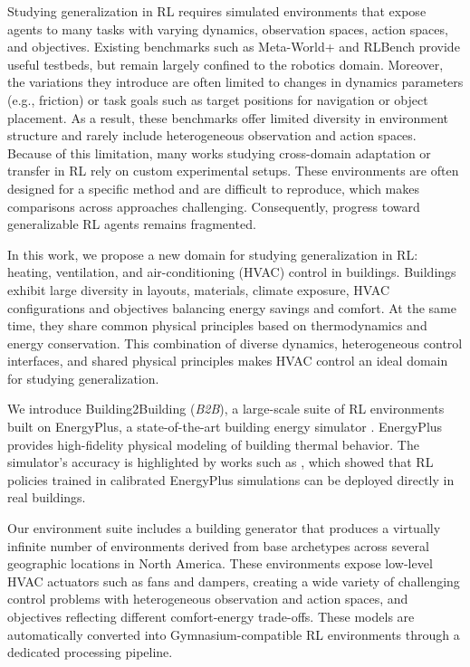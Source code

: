 \documentclass[10pt]{article} %
\newcommand{\btob}{{\textit{B2B}}}
\newcommand{\buildingtobuilding}{{Building2Building}}
\begin{document}
Studying generalization in RL requires simulated environments that expose agents to many tasks with varying dynamics, observation spaces, action spaces, and objectives. Existing benchmarks such as Meta-World+ \cite{mclean2025} and RLBench \cite{stephen2020} provide useful testbeds, but remain largely confined to the robotics domain. Moreover, the variations they introduce are often limited to changes in dynamics parameters (e.g., friction) or task goals such as target positions for navigation or object placement. As a result, these benchmarks offer limited diversity in environment structure and rarely include heterogeneous observation and action spaces. Because of this limitation, many works studying cross-domain adaptation or transfer in RL rely on custom experimental setups. These environments are often designed for a specific method and are difficult to reproduce, which makes comparisons across approaches challenging. Consequently, progress toward generalizable RL agents remains fragmented.

In this work, we propose a new domain for studying generalization in RL: heating, ventilation, and air-conditioning (HVAC) control in buildings. Buildings exhibit large diversity in layouts, materials, climate exposure, HVAC configurations and objectives balancing energy savings and comfort. At the same time, they share common physical principles based on thermodynamics and energy conservation. This combination of diverse dynamics, heterogeneous control interfaces, and shared physical principles makes HVAC control an ideal domain for studying generalization.

We introduce \buildingtobuilding{} (\btob{}), a large-scale suite of RL environments built on EnergyPlus, a state-of-the-art building energy simulator \cite{energyplus}. EnergyPlus provides high-fidelity physical modeling of building thermal behavior. The simulator's accuracy is highlighted by works such as \cite{zhang2019}, which showed that RL policies trained in calibrated EnergyPlus simulations can be deployed directly in real buildings. 

Our environment suite includes a building generator that produces a virtually infinite number of environments derived from base archetypes across several geographic locations in North America. These environments expose low-level HVAC actuators such as fans and dampers, creating a wide variety of challenging control problems with heterogeneous observation and action spaces, and objectives reflecting different comfort-energy trade-offs. These models are automatically converted into Gymnasium-compatible RL environments through a dedicated processing pipeline. 
\end{document}
